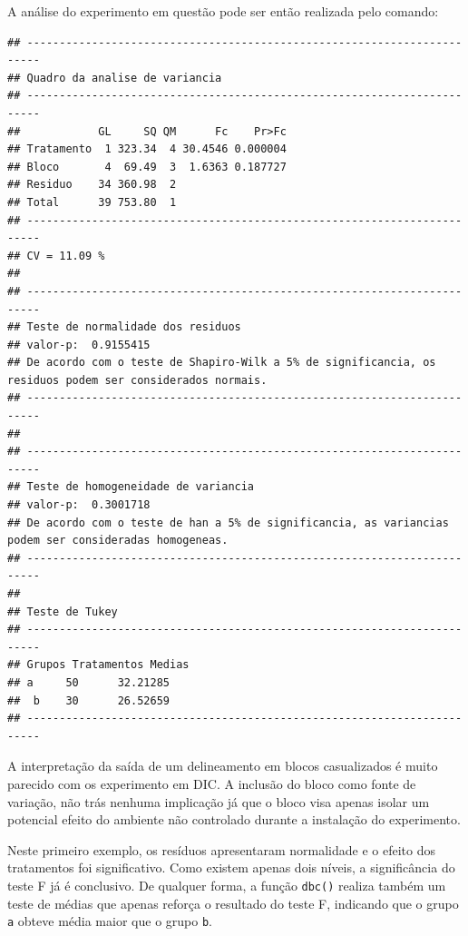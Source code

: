 \documentclass[
]{article}
\newenvironment{Shaded}{\begin{snugshade}}{\end{snugshade}}
\newcommand{\DataTypeTok}[1]{\textcolor[rgb]{0.13,0.29,0.53}{#1}}
\newcommand{\KeywordTok}[1]{\textcolor[rgb]{0.13,0.29,0.53}{\textbf{#1}}}
\newcommand{\NormalTok}[1]{#1}
\newcommand{\OperatorTok}[1]{\textcolor[rgb]{0.81,0.36,0.00}{\textbf{#1}}}
\newcommand{\StringTok}[1]{\textcolor[rgb]{0.31,0.60,0.02}{#1}}
\begin{document}
A análise do experimento em questão pode ser então realizada pelo comando:

\begin{Shaded}
\end{Shaded}

\begin{verbatim}
## ------------------------------------------------------------------------
## Quadro da analise de variancia
## ------------------------------------------------------------------------
##            GL     SQ QM      Fc    Pr>Fc
## Tratamento  1 323.34  4 30.4546 0.000004
## Bloco       4  69.49  3  1.6363 0.187727
## Residuo    34 360.98  2                 
## Total      39 753.80  1                 
## ------------------------------------------------------------------------
## CV = 11.09 %
## 
## ------------------------------------------------------------------------
## Teste de normalidade dos residuos 
## valor-p:  0.9155415 
## De acordo com o teste de Shapiro-Wilk a 5% de significancia, os residuos podem ser considerados normais.
## ------------------------------------------------------------------------
## 
## ------------------------------------------------------------------------
## Teste de homogeneidade de variancia 
## valor-p:  0.3001718 
## De acordo com o teste de han a 5% de significancia, as variancias podem ser consideradas homogeneas.
## ------------------------------------------------------------------------
## 
## Teste de Tukey
## ------------------------------------------------------------------------
## Grupos Tratamentos Medias
## a     50      32.21285 
##  b    30      26.52659 
## ------------------------------------------------------------------------
\end{verbatim}

A interpretação da saída de um delineamento em blocos casualizados é muito parecido com os experimento em DIC. A inclusão do bloco como fonte de variação, não trás nenhuma implicação já que o bloco visa apenas isolar um potencial efeito do ambiente não controlado durante a instalação do experimento.

Neste primeiro exemplo, os resíduos apresentaram normalidade e o efeito dos tratamentos foi significativo. Como existem apenas dois níveis, a significância do teste F já é conclusivo. De qualquer forma, a função \texttt{dbc()} realiza também um teste de médias que apenas reforça o resultado do teste F, indicando que o grupo \texttt{a} obteve média maior que o grupo \texttt{b}.
\end{document}

